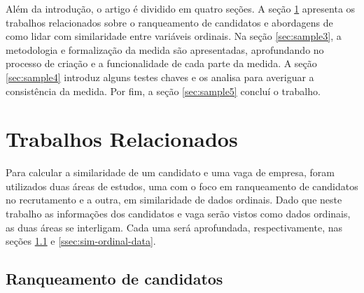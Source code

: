 \documentclass[preprint,12pt]{elsarticle}
\begin{document}

Além da introdução, o artigo é dividido em quatro seções. A seção \ref{sec:sample2} apresenta os trabalhos relacionados sobre o ranqueamento de candidatos e abordagens de como lidar com similaridade entre variáveis ordinais. Na seção \ref{sec:sample3}, a metodologia e formalização da medida são apresentadas, aprofundando no processo de criação e a funcionalidade de cada parte da medida. A seção \ref{sec:sample4} introduz alguns testes chaves e os analisa para averiguar a consistência da medida. Por fim, a seção \ref{sec:sample5} concluí o trabalho.

\section{Trabalhos Relacionados}
\label{sec:sample2}

Para calcular a similaridade de um candidato e uma vaga de empresa, foram utilizados duas áreas de estudos, uma com o foco em ranqueamento de candidatos no recrutamento e a outra, em similaridade de dados ordinais. Dado que neste trabalho as informações dos candidatos e vaga serão vistos como dados ordinais, as duas áreas se interligam. Cada uma será aprofundada, respectivamente, nas seções \ref{ssec:sim-candidate-company} e \ref{ssec:sim-ordinal-data}. 

\subsection{Ranqueamento de candidatos}
\label{ssec:sim-candidate-company}
\end{document}
